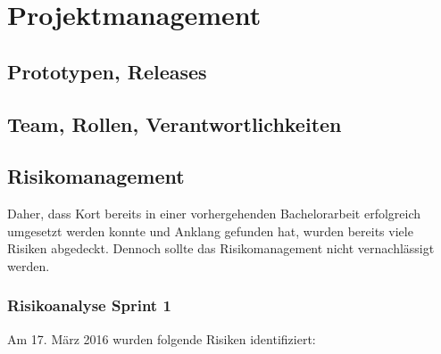 \chapter{Projektmanagement}
\label{pm-projektmanagement}

\section{Prototypen, Releases}


\section{Team, Rollen, Verantwortlichkeiten}


\section{Risikomanagement}
Daher, dass  Kort bereits in einer vorhergehenden Bachelorarbeit erfolgreich umgesetzt werden konnte und Anklang gefunden hat, wurden bereits viele Risiken abgedeckt.
Dennoch sollte das Risikomanagement nicht vernachlässigt werden.

\subsection{Risikoanalyse Sprint 1}
Am 17. März 2016 wurden folgende Risiken identifiziert:

